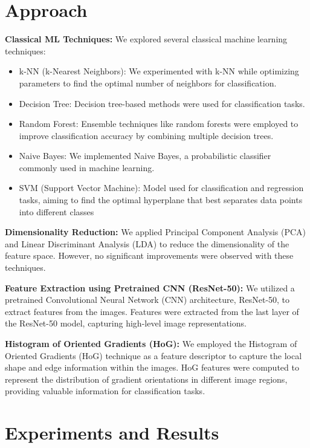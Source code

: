 \documentclass[a4paper]{article}
\theoremstyle{plain}
\theoremstyle{definition}
\begin{document}
    
	\newpage
	

\section{Approach}

\textbf{Classical ML Techniques:}
We explored several classical machine learning techniques:
\begin{itemize}
    \item k-NN (k-Nearest Neighbors): We experimented with k-NN while optimizing parameters to find the optimal number of neighbors for classification.
    \item Decision Tree: Decision tree-based methods were used for classification tasks.
    \item Random Forest: Ensemble techniques like random forests were employed to improve classification accuracy by combining multiple decision trees.
    \item Naive Bayes: We implemented Naive Bayes, a probabilistic classifier commonly used in machine learning.
    \item SVM (Support Vector Machine): Model used for classification and regression tasks, aiming to find the optimal hyperplane that best separates data points into different classes
\end{itemize}

\textbf{Dimensionality Reduction:}
We applied Principal Component Analysis (PCA) and Linear Discriminant Analysis (LDA) to reduce the dimensionality of the feature space. However, no significant improvements were observed with these techniques.

\textbf{Feature Extraction using Pretrained CNN (ResNet-50):}
We utilized a pretrained Convolutional Neural Network (CNN) architecture, ResNet-50, to extract features from the images. Features were extracted from the last layer of the ResNet-50 model, capturing high-level image representations.

\textbf{Histogram of Oriented Gradients (HoG):}
We employed the Histogram of Oriented Gradients (HoG) technique as a feature descriptor to capture the local shape and edge information within the images. HoG features were computed to represent the distribution of gradient orientations in different image regions, providing valuable information for classification tasks.


\section{Experiments and Results}
\end{document}
